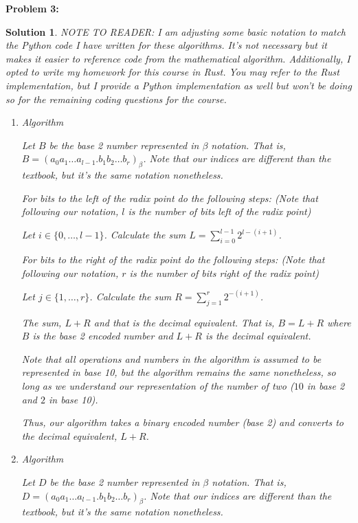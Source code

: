 \documentclass[12pt, letterpaper]{article}
\theoremstyle{nonumberplain}
\newtheorem{sol}{Solution}
\begin{document}
\newpage

\hspace{18pt}\textbf{Problem 3:} \medskip
\begin{sol}
	NOTE TO READER: I am adjusting some basic notation to match the Python code I have written for these algorithms. It's not necessary but it makes it easier to reference code from the mathematical algorithm. Additionally, I opted to write my homework for this course in Rust. You may refer to the Rust implementation, but I provide a Python implementation as well but won't be doing so for the remaining coding questions for the course.
	\begin{enumerate}[label=\alph*)]
		\item Algorithm

		      Let $B$ be the base 2 number represented in $\beta$ notation. That is, $B = (a_0 a_1 \ldots a_{l-1}.b_1 b_2 \ldots b_r)_\beta$. Note that our indices are different than the textbook, but it's the same notation nonetheless.

		      For bits to the left of the radix point do the following steps: (Note that following our notation, $l$ is the number of bits left of the radix point)

		      Let $i\in \{0, \ldots, l-1\}$. Calculate the sum $L = \sum_{i=0}^{l-1}2^{l - (i+1)}$.

		      For bits to the right of the radix point do the following steps: (Note that following our notation, $r$ is the number of bits right of the radix point)

		      Let $j\in \{1, \ldots, r\}$. Calculate the sum $R = \sum_{j=1}^r 2^{-(i+1)}$.

		      The sum, $L+R$ and that is the decimal equivalent. That is, $B = L+R$ where $B$ is the base 2 encoded number and $L+R$ is the decimal equivalent.

		      Note that all operations and numbers in the algorithm is assumed to be represented in base 10, but the algorithm remains the same nonetheless, so long as we understand our representation of the number of two ($10$ in base 2 and $2$ in base 10).

		      Thus, our algorithm takes a binary encoded number (base 2) and converts to the decimal equivalent, $L+R$.


		\item Algorithm

		      Let $D$ be the base 2 number represented in $\beta$ notation. That is, $D = (a_0 a_1 \ldots a_{l-1}.b_1 b_2 \ldots b_r)_\beta$. Note that our indices are different than the textbook, but it's the same notation nonetheless.


\end{enumerate}
\end{sol}
\end{document}
